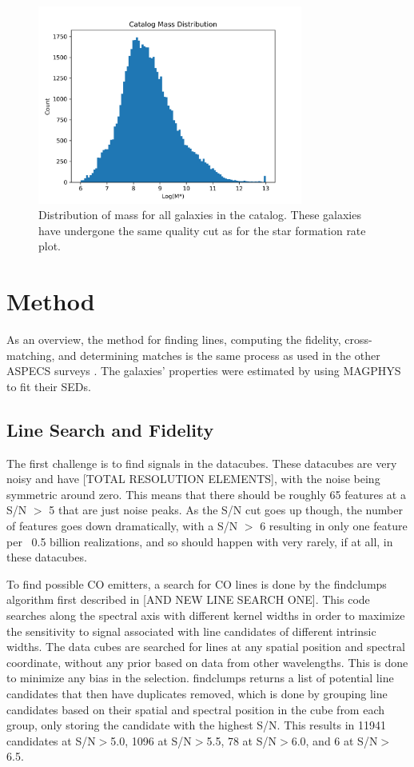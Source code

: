\begin{figure}[!tbp]
\centering \includegraphics[width=87mm]{Survey/MAGPHYS_Mstar.png}
\caption{Distribution of mass for all galaxies in the catalog. These galaxies have undergone the same quality cut as for the star formation rate plot.}
\label{fig:MAGPHYS_Properties}
\end{figure}

\section{Method}

As an overview, the method for finding lines, computing the fidelity, cross-matching, and determining matches is the same process as used in the other ASPECS surveys \cite{walter2016alma, decarli2019alma}. The galaxies' properties were estimated by using MAGPHYS to fit their SEDs.

\subsection{Line Search and Fidelity}

The first challenge is to find signals in the datacubes. These datacubes are very noisy and have [TOTAL RESOLUTION ELEMENTS], with the noise being symmetric around zero. This means that there should be roughly 65 features at a S/N $>$ 5 that are just noise peaks. As the S/N cut goes up though, the number of features goes down dramatically, with a S/N $>$ 6 resulting in only one feature per ~0.5 billion realizations, and so should happen with very rarely, if at all, in these datacubes.

To find possible CO emitters, a search for CO lines is done by the findclumps algorithm first described in \cite{walter2016alma} [AND NEW LINE SEARCH ONE]. This code searches along the spectral axis with different kernel widths in order to maximize the sensitivity to signal associated with line candidates of different intrinsic widths. The data cubes are searched for lines at any spatial position and spectral coordinate, without any prior based on data from other wavelengths. This is done to minimize any bias in the selection. findclumps returns a list of potential line candidates that then have duplicates removed, which is done by grouping line candidates based on their spatial and spectral position in the cube from each group, only storing the candidate with the highest S/N. This results in 11941 candidates at S/N$>$5.0, 1096 at S/N$>$5.5, 78 at S/N$>$6.0, and 6 at S/N$>$6.5. 

